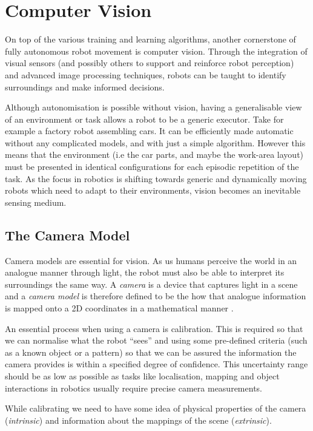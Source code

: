 \section{Computer Vision}
On top of the various training and learning algorithms, another cornerstone of fully autonomous robot movement is computer vision. Through the integration of visual sensors (and possibly others to support and reinforce robot perception) and advanced image processing techniques, robots can be taught to identify surroundings and make informed decisions. 

Although autonomisation is possible without vision, having a generalisable view of an environment or task allows a robot to be a generic executor. Take for example a factory robot assembling cars. It can be efficiently made automatic without any complicated models, and with just a simple algorithm. However this means that the environment (i.e the car parts, and maybe the work-area layout) must be presented in identical configurations for each episodic repetition of the task.
As the focus in robotics is shifting towards generic and dynamically moving robots which need to adapt to their environments, vision becomes an inevitable sensing medium.

\subsection{The Camera Model}
Camera models are essential for vision. As us humans perceive the world in an analogue manner through light, the robot must also be able to interpret its surroundings the same way. A \emph{camera} is a device that captures light in a scene and a \emph{camera model} is therefore defined to be the how that analogue information is mapped onto a 2D coordinates in a mathematical manner \cite{zhang2021cameramodels}. 

An essential process when using a camera is calibration. This is required so that we can normalise what the robot ``sees'' and using some pre-defined criteria (such as a known object or a pattern) so that we can be assured the information the camera provides is within a specified degree of confidence. This uncertainty range should be as low as possible as tasks like localisation, mapping and object interactions in robotics usually require precise camera measurements.

While calibrating we need to have some idea of physical properties of the camera (\emph{intrinsic}) and information about the mappings of the scene (\emph{extrinsic}).

